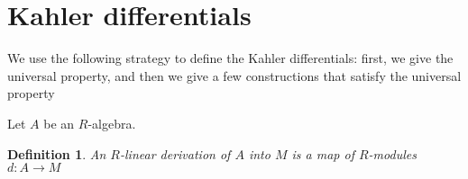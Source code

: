 \documentclass[a4paper]{article}
\newtheorem{prop}[thm]{Proposition}
\newtheorem{defn}[thm]{Definition}
\newcommand{\Spec}{\operatorname{Spec}}
\begin{document}
%
%			
%
%

\section{Kahler differentials}


\newcommand{\Der}{\operatorname{Der}}

We use the following strategy to define
the Kahler differentials:
first, we give the universal property, 
and then we give a few constructions that
satisfy the universal property

Let \(A\) be an \(R\)-algebra. 
\begin{defn}
	An \(R\)-linear derivation of \(A\) into \(M\) 
	is a map of \(R\)-modules
	\(d \colon A \to M\) 
\end{defn}
\end{document}
